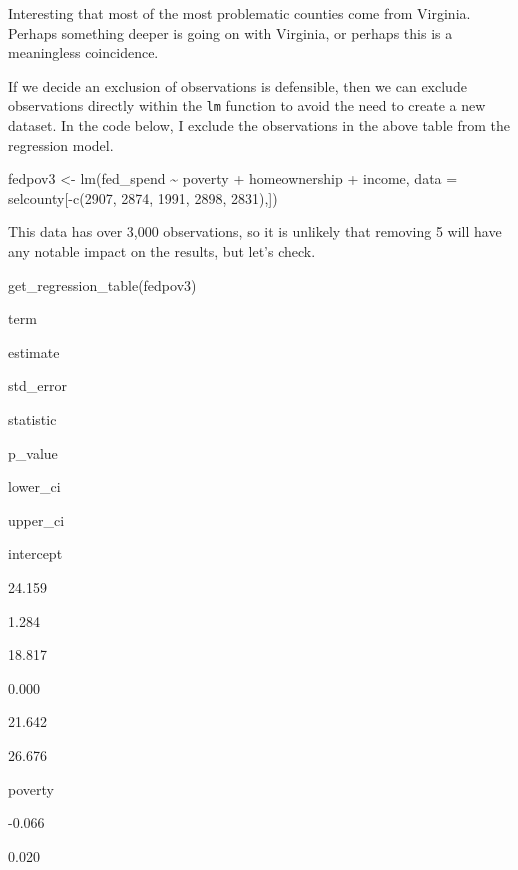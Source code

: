 \documentclass[
]{book}
\makeatletter
\newenvironment{Shaded}{\begin{snugshade}}{\end{snugshade}}
\newcommand{\AttributeTok}[1]{\textcolor[rgb]{0.61,0.61,0.61}{#1}}
\newcommand{\DecValTok}[1]{\textcolor[rgb]{0.06,0.06,0.06}{#1}}
\newcommand{\FunctionTok}[1]{\textcolor[rgb]{0,0,0}{#1}}
\newcommand{\NormalTok}[1]{#1}
\newcommand{\OtherTok}[1]{\textcolor[rgb]{0.37,0.37,0.37}{#1}}
\newcommand{\SpecialCharTok}[1]{\textcolor[rgb]{0,0,0}{#1}}
\newenvironment{kframe}{%
\medskip{}
\setlength{\fboxsep}{.8em}
 \def\at@end@of@kframe{}%
 \ifinner\ifhmode%
  \def\at@end@of@kframe{\end{minipage}}%
  \begin{minipage}{\columnwidth}%
 \fi\fi%
 \def\FrameCommand##1{\hskip\@totalleftmargin \hskip-\fboxsep
 \colorbox{shadecolor}{##1}\hskip-\fboxsep
     \hskip-\linewidth \hskip-\@totalleftmargin \hskip\columnwidth}%
 \MakeFramed {\advance\hsize-\width
   \@totalleftmargin\z@ \linewidth\hsize
   \@setminipage}}%
 {\par\unskip\endMakeFramed%
 \at@end@of@kframe}
\renewenvironment{Shaded}{\begin{kframe}}{\end{kframe}}
\makeatother
\begin{document}
Interesting that most of the most problematic counties come from Virginia. Perhaps something deeper is going on with Virginia, or perhaps this is a meaningless coincidence.

If we decide an exclusion of observations is defensible, then we can exclude observations directly within the \texttt{lm} function to avoid the need to create a new dataset. In the code below, I exclude the observations in the above table from the regression model.

\begin{Shaded}
\begin{Highlighting}[]
\NormalTok{fedpov3 }\OtherTok{\textless{}{-}} \FunctionTok{lm}\NormalTok{(fed\_spend }\SpecialCharTok{\textasciitilde{}}\NormalTok{ poverty }\SpecialCharTok{+}\NormalTok{ homeownership }\SpecialCharTok{+}\NormalTok{ income, }
              \AttributeTok{data =}\NormalTok{ selcounty[}\SpecialCharTok{{-}}\FunctionTok{c}\NormalTok{(}\DecValTok{2907}\NormalTok{, }\DecValTok{2874}\NormalTok{, }\DecValTok{1991}\NormalTok{, }\DecValTok{2898}\NormalTok{, }\DecValTok{2831}\NormalTok{),])}
\end{Highlighting}
\end{Shaded}

This data has over 3,000 observations, so it is unlikely that removing 5 will have any notable impact on the results, but let's check.

\begin{Shaded}
\begin{Highlighting}[]
\FunctionTok{get\_regression\_table}\NormalTok{(fedpov3)}
\end{Highlighting}
\end{Shaded}

term

estimate

std\_error

statistic

p\_value

lower\_ci

upper\_ci

intercept

24.159

1.284

18.817

0.000

21.642

26.676

poverty

-0.066

0.020
\end{document}

